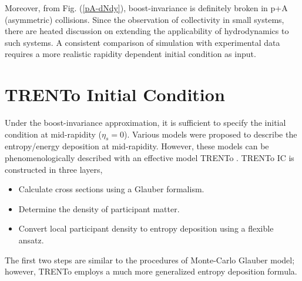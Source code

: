 \documentclass[aps,prl,twocolumn,groupedaddress]{revtex4-1}
\begin{document}
	Moreover, from Fig. (\ref{pA-dNdy}), boost-invariance is definitely broken in p+A (asymmetric) collisions.
	Since the observation of collectivity in small systems, there are heated discussion on extending the applicability of hydrodynamics to such systems.
	A consistent comparison of simulation with experimental data requires a more realistic rapidity dependent initial condition as input.
	
	
	
	\section{TRENTo Initial Condition}
	Under the boost-invariance approximation, it is sufficient to specify the initial condition at mid-rapidity ($\eta_s = 0$). Various models were proposed to describe the entropy/energy deposition at mid-rapidity. 
	However, these models can be phenomenologically described with an effective model TRENTo \cite{Moreland:2014oya}. 
	TRENTo IC is constructed in three layers,
	\begin{itemize}
		\item Calculate cross sections using a Glauber formalism.
		\item Determine the density of participant matter. 
		\item Convert local participant density to entropy deposition using a flexible ansatz.
	\end{itemize}
	The first two steps are similar to the procedures of Monte-Carlo Glauber model; however, TRENTo employs a much more generalized entropy deposition formula.
\end{document}
